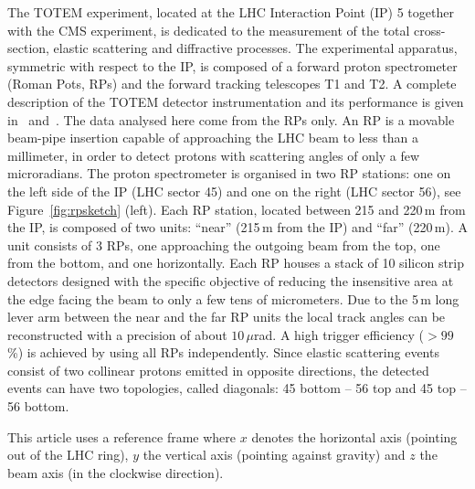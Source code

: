 The TOTEM experiment, located at the LHC Interaction Point (IP) 5 together with
the CMS experiment, is dedicated to the measurement of the total 
cross-section, elastic scattering
and diffractive processes. The experimental
apparatus, symmetric with respect to the IP, is 
composed of a forward proton spectrometer (Roman Pots, RPs) and the 
forward tracking telescopes T1 and T2. 
A complete description of the TOTEM detector instrumentation 
and its performance is given in~\cite{totem-jinst} and~\cite{totem-ijmp}. 
The data analysed here come from the RPs only. An RP is a movable beam-pipe
insertion capable of approaching the LHC beam to less than a millimeter, in 
order to detect protons with scattering angles of only a few microradians. 
The proton spectrometer is organised in two RP stations: one on the left side of the IP 
(LHC sector 45) and one on the right (LHC sector 56), see Figure~\ref{fig:rpsketch} (left).
Each RP station, located between 215 and 220\,m from the IP, is composed of two 
units: ``near'' (215\,m from the IP) and ``far'' (220\,m). 
A unit consists of 3 RPs, one
approaching the outgoing beam from the top, one from the bottom, and one 
horizontally.
Each RP houses a stack of 10 silicon
strip detectors designed with the specific objective of
reducing the insensitive area at the edge facing the beam
to only a few tens of micrometers. Due to the 5\,m long lever arm 
between the near and the far RP units 
the local track angles can be reconstructed
with a precision of about $10\,\mu$rad. A high trigger efficiency
($> 99$\%) is achieved by using all RPs independently. 
Since elastic scattering events consist of two collinear protons emitted in 
opposite directions, the detected events can have two topologies, called 
diagonals: 45 bottom -- 56 top and 45 top -- 56 bottom.

This article uses a reference frame where $x$ denotes the horizontal axis (pointing out of the LHC ring), $y$ the vertical axis (pointing against gravity) and $z$ the beam axis (in the clockwise direction).
